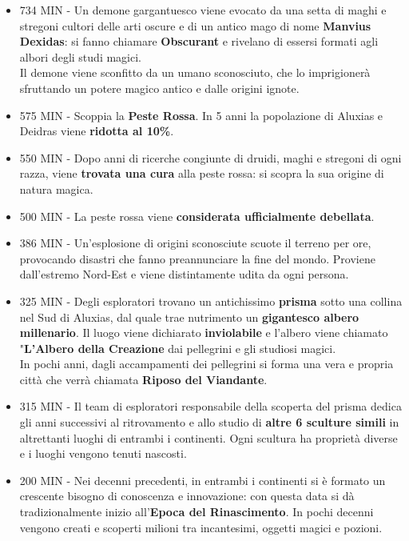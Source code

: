 \documentclass[10pt,twoside,onecolumn,openany]{book}
\begin{document}
\begin{multicols}{2}
\begin{itemize}
\item 734 MIN - Un demone gargantuesco viene evocato da una setta di maghi e stregoni cultori delle arti oscure e di un antico mago di nome \textbf{Manvius Dexidas}: si fanno chiamare \textbf{Obscurant} e rivelano di essersi formati agli albori degli studi magici.\\
Il demone viene sconfitto da un umano sconosciuto, che lo imprigionerà sfruttando un potere magico antico e dalle origini ignote.\\
\item 575 MIN - Scoppia la \textbf{Peste Rossa}. In 5 anni la popolazione di Aluxias e Deidras viene \textbf{ridotta al 10\%}. \\
\item 550 MIN - Dopo anni di ricerche congiunte di druidi, maghi e stregoni di ogni razza, viene \textbf{trovata una cura} alla peste rossa: si scopra la sua origine di natura magica.\\
\item 500 MIN - La peste rossa viene \textbf{considerata ufficialmente debellata}.\\
\item 386 MIN - Un'esplosione di origini sconosciute scuote il terreno per ore, provocando disastri che fanno preannunciare la fine del mondo. Proviene dall'estremo Nord-Est e viene distintamente udita da ogni persona.\\
\item 325 MIN - Degli esploratori trovano un antichissimo \textbf{prisma} sotto una collina nel Sud di Aluxias, dal quale trae nutrimento un \textbf{gigantesco albero millenario}. Il luogo viene dichiarato \textbf{inviolabile} e l'albero viene chiamato "\textbf{L'Albero della Creazione} dai pellegrini e gli studiosi magici.\\In pochi anni, dagli accampamenti dei pellegrini si forma una vera e propria città che verrà chiamata \textbf{Riposo del Viandante}.\\
\item 315 MIN - Il team di esploratori responsabile della scoperta del prisma dedica gli anni successivi al ritrovamento e allo studio di \textbf{altre 6 sculture simili} in altrettanti luoghi di entrambi i continenti. Ogni scultura ha proprietà diverse e i luoghi vengono tenuti nascosti.\\
\item 200 MIN - Nei decenni precedenti, in entrambi i continenti si è formato un crescente bisogno di conoscenza e innovazione: con questa data si dà tradizionalmente inizio all'\textbf{Epoca del Rinascimento}. In pochi decenni vengono creati e scoperti milioni tra incantesimi, oggetti magici e pozioni.\\

\end{itemize}
\end{multicols}
\end{document}
